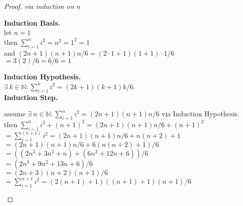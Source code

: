 \documentclass[12pt]{jhwhw}
\begin{document}
\solution
\begin{proof} \textit{via induction on n}

\bigbreak
\textbf{Induction Basis.} \\
	let $n=1$ \\
	then $\sum_{i=1}^{n}i^{2} = n^2 = 1^2 = 1$ \\
	and $(2n+1)(n+1)n/6 = (2\cdot 1+1)(1+1)\cdot 1/6$ \\
	$= 3(2)/6 = 6/6 = 1$

\bigbreak
\textbf{Induction Hypothesis.} \\
	$\exists\ k\in \mathbb{N} : \sum_{i=1}^{k} i^{2} = (2k+1)(k+1)k/6$. \\

\bigbreak
\textbf{Induction Step.} \\
\begin{spacing}{1.4}
	assume $\exists\ n\in \mathbb{N} : \sum_{i=1}^{n} i^{2} = (2n+1)(n+1)n/6$ via Induction Hypothesis.\\
	then $\sum_{i=1}^{n}i^{2} + (n+1)^2 = (2n+1)(n+1)n/6 + (n+1)^2$ \\
	$ = \sum_{i=1}^{(n+1)}i^{2} = (2n+1)(n+1)n/6 + n(n+2)+1$ \\
	$ = (2n+1)(n+1)n/6 + 6(n(n+2)+1)/6$ \\
	$ = ((2n^3 + 3n^2 + n) + (6n^2 + 12n + 6))/6$ \\
	$ = (2n^3 + 9n^2 + 13n + 6)/6$ \\
	$ = (2n+3)(n+2)(n+1)/6$ \\
	$ = \sum_{i=1}^{n+1}i^{2} = (2(n+1)+1)((n+1)+1)(n+1)/6$ \\

\end{spacing}
\end{proof}
\end{document}
